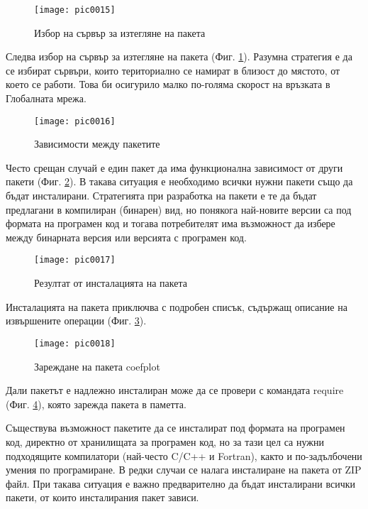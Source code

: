 \begin{figure}[h!]
  \centering
  \texttt{[image: pic0015]}
  \caption{Избор на сървър за изтегляне на пакета}
\label{figure0015}
\end{figure}
\FloatBarrier

Следва избор на сървър за изтегляне на пакета (Фиг. \ref{figure0015}). Разумна стратегия е да се избират сървъри, които териториално се намират в близост до мястото, от което се работи. Това би осигурило малко по-голяма скорост на връзката в Глобалната мрежа.

\begin{figure}[h!]
  \centering
  \texttt{[image: pic0016]}
  \caption{Зависимости между пакетите}
\label{figure0016}
\end{figure}
\FloatBarrier

Често срещан случай е един пакет да има функционална зависимост от други пакети (Фиг. \ref{figure0016}). В такава ситуация е необходимо всички нужни пакети също да бъдат инсталирани. Стратегията при разработка на пакети е те да бъдат предлагани в компилиран (бинарен) вид, но понякога най-новите версии са под формата на програмен код и тогава потребителят има възможност да избере между бинарната версия или версията с програмен код. 

\begin{figure}[h!]
  \centering
  \texttt{[image: pic0017]}
  \caption{Резултат от инсталацията на пакета}
\label{figure0017}
\end{figure}
\FloatBarrier

Инсталацията на пакета приключва с подробен списък, съдържащ описание на извършените операции (Фиг. \ref{figure0017}).

\begin{figure}[h!]
  \centering
  \texttt{[image: pic0018]}
  \caption{Зареждане на пакета coefplot}
\label{figure0018}
\end{figure}
\FloatBarrier

Дали пакетът е надлежно инсталиран може да се провери с командата require (Фиг. \ref{figure0018}), която зарежда пакета в паметта.

Съществува възможност пакетите да се инсталират под формата на програмен код, директно от хранилищата за програмен код, но за тази цел са нужни подходящите компилатори (най-често C/C++ и Fortran), както и по-задълбочени умения по програмиране. В редки случаи се налага инсталиране на пакета от ZIP файл. При такава ситуация е важно предварително да бъдат инсталирани всички пакети, от които инсталирания пакет зависи.


